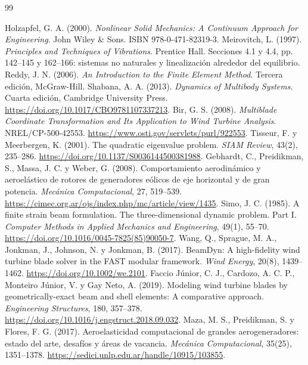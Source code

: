 \documentclass[11pt,a4paper,oneside]{report}
\begin{document}
\tableofcontents\listoffigures
\clearpage{}







\begin{thebibliography}{99}
 Holzapfel, G. A. (2000). \emph{Nonlinear Solid Mechanics: A Continuum Approach for Engineering}. John Wiley \& Sons. ISBN 978-0-471-82319-3.
 Meirovitch, L. (1997). \emph{Principles and Techniques of Vibrations}. Prentice Hall. Secciones 4.1 y 4.4, pp. 142--145 y 162--166: sistemas no naturales y linealización alrededor del equilibrio.
 Reddy, J. N. (2006). \emph{An Introduction to the Finite Element Method}. Tercera edición, McGraw-Hill.
 Shabana, A. A. (2013). \emph{Dynamics of Multibody Systems}. Cuarta edición, Cambridge University Press. \url{https://doi.org/10.1017/CBO9781107337213}.
 Bir, G. S. (2008). \emph{Multiblade Coordinate Transformation and Its Application to Wind Turbine Analysis}. NREL/CP-500-42553. \url{https://www.osti.gov/servlets/purl/922553}.
 Tisseur, F. y Meerbergen, K. (2001). The quadratic eigenvalue problem. \emph{SIAM Review}, 43(2), 235--286. \url{https://doi.org/10.1137/S0036144500381988}.
 Gebhardt, C., Preidikman, S., Massa, J. C. y Weber, G. (2008). Comportamiento aerodinámico y aeroelástico de rotores de generadores eólicos de eje horizontal y de gran potencia. \emph{Mecánica Computacional}, 27, 519--539. \url{https://cimec.org.ar/ojs/index.php/mc/article/view/1435}.
 Simo, J. C. (1985). A finite strain beam formulation. The three-dimensional dynamic problem. Part I. \emph{Computer Methods in Applied Mechanics and Engineering}, 49(1), 55--70. \url{https://doi.org/10.1016/0045-7825(85)90050-7}.
 Wang, Q., Sprague, M. A., Jonkman, J., Johnson, N. y Jonkman, B. (2017). BeamDyn: A high-fidelity wind turbine blade solver in the FAST modular framework. \emph{Wind Energy}, 20(8), 1439--1462. \url{https://doi.org/10.1002/we.2101}.
 Faccio Júnior, C. J., Cardozo, A. C. P., Monteiro Júnior, V. y Gay Neto, A. (2019). Modeling wind turbine blades by geometrically-exact beam and shell elements: A comparative approach. \emph{Engineering Structures}, 180, 357--378. \url{https://doi.org/10.1016/j.engstruct.2018.09.032}.
 Maza, M. S., Preidikman, S. y Flores, F. G. (2017). Aeroelasticidad computacional de grandes aerogeneradores: estado del arte, desafíos y áreas de vacancia. \emph{Mecánica Computacional}, 35(25), 1351--1378. \url{https://sedici.unlp.edu.ar/handle/10915/103855}.

\end{thebibliography}
\end{document}
